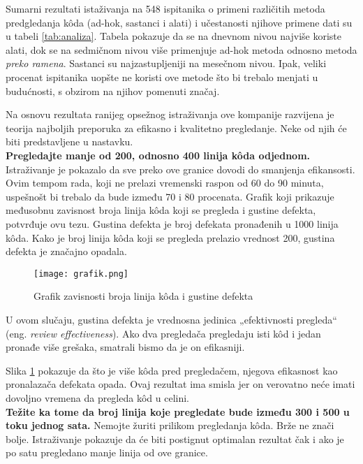 \documentclass[a4paper]{article}
\begin{document}
Sumarni rezultati istaživanja na 548 ispitanika o primeni različitih metoda predgledanja kôda (ad-hok, sastanci i alati) i učestanosti njihove primene dati su u tabeli \ref{tab:analiza}. Tabela pokazuje da se na dnevnom nivou najviše koriste alati, dok se na sedmičnom nivou više primenjuje ad-hok metoda odnosno metoda \emph{preko ramena}. Sastanci su najzastupljeniji na mesečnom nivou. Ipak, veliki procenat ispitanika uopšte ne koristi ove metode što bi trebalo menjati u budućnosti, s obzirom na njihov pomenuti značaj.

Na osnovu rezultata ranijeg opsežnog istraživanja ove kompanije razvijena je teorija najboljih preporuka za efikasno i kvalitetno pregledanje. \cite{ibm} Neke od njih će biti predstavljene u nastavku. \\

\textbf{Pregledajte manje od 200, odnosno 400 linija kôda odjednom.}
Istraživanje je pokazalo da sve preko ove granice dovodi do smanjenja efikansosti. Ovim tempom rada, koji ne prelazi vremenski raspon od 60 do 90 minuta, uspešnošt bi trebalo da bude između 70 i 80 procenata. Grafik koji prikazuje međusobnu zavisnost broja linija kôda koji se pregleda i gustine defekta, potvrđuje ovu tezu. Gustina defekta je broj defekata pronađenih u 1000 linija kôda. Kako je broj linija kôda koji se pregleda prelazio vrednost 200, gustina defekta je značajno opadala.

\begin{figure}[ht]
\begin{center}
\texttt{[image: grafik.png]}
\end{center}
\caption{Grafik zavisnosti broja linija kôda i gustine defekta}
\label{fig:linije}
\end{figure}

U ovom slučaju, gustina defekta je vrednosna jedinica „efektivnosti pregleda“ (eng. \emph{review effectiveness}). Ako dva pregledača pregledaju isti kôd i jedan pronađe više grešaka, smatrali bismo da je on efikasniji. 

Slika \ref{fig:linije} pokazuje da što je više kôda pred pregledačem, njegova efikasnost kao pronalazača defekata opada. Ovaj rezultat ima smisla jer on verovatno neće imati dovoljno vremena da pregleda kôd u celini. \\

\textbf{Težite ka tome da broj linija koje pregledate bude između 300 i 500 u toku jednog sata.}
Nemojte žuriti prilikom pregledanja kôda. Brže ne znači bolje. Istraživanje pokazuje da će biti postignut optimalan rezultat čak i ako je po satu pregledano manje linija od ove granice.
\end{document}
